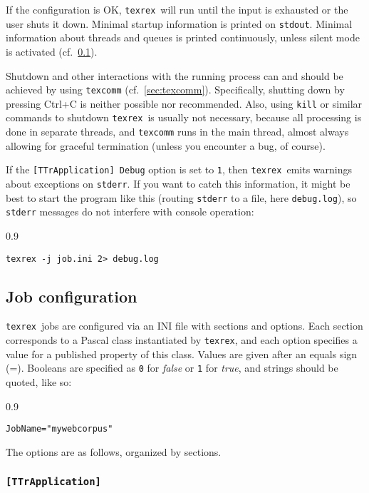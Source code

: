 \documentclass[12pt,a4paper]{article}
\newenvironment{bx}
{
  \begin{center}
  \begin{boxedminipage}[h]{0.9\textwidth}
  \small
}
{
  \end{boxedminipage}
  \end{center}
}
\newcommand{\trthis}{\texttt{texrex}}
\begin{document}
If the configuration is OK, \trthis\ will run until the input is exhausted or the user shuts it down.
Minimal startup information is printed on \texttt{stdout}.
Minimal information about threads and queues is printed continuously, unless silent mode is activated (cf.\ \ref{sec:conf}).

Shutdown and other interactions with the running process can and should be achieved by using \texttt{texcomm} (cf.\ \ref{sec:texcomm}).
Specifically, shutting down by pressing Ctrl+C is neither possible nor recommended.
Also, using \texttt{kill} or similar commands to shutdown \trthis\ is usually not necessary, because all processing is done in separate threads, and \texttt{texcomm} runs in the main thread, almost always allowing for graceful termination (unless you encounter a bug, of course).

If the \texttt{[TTrApplication] Debug} option is set to \texttt{1}, then \trthis\ emits warnings about exceptions on \texttt{stderr}.
If you want to catch this information, it might be best to start the program like this (routing \texttt{stderr} to a file, here \texttt{debug.log}), so \texttt{stderr} messages do not interfere with console operation:

\begin{bx}
\texttt{texrex -j job.ini 2> debug.log }
\end{bx}

\subsection{Job configuration}
\label{sec:conf}

\trthis\ jobs are configured via an INI file with sections and options.
Each section corresponds to a Pascal class instantiated by \texttt{texrex}, and each option specifies a value for a published property of this class.
Values are given after an equals sign (=).
Booleans are specified as \texttt{0} for \textit{false} or \texttt{1} for \textit{true}, and strings should be quoted, like so:

\begin{bx}
\texttt{JobName="mywebcorpus"}
\end{bx}

The options are as follows, organized by sections.

\subsubsection{\texttt{[TTrApplication]}}
\label{sec:application}
\end{document}
